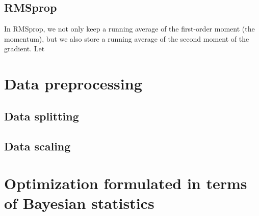 \subsection{RMSprop}
In RMSprop, we not only keep a running average of the first-order moment (the momentum), 
but we also store a running average of the second moment of the gradient. Let 

\section{Data preprocessing}
\subsection{Data splitting}
\subsection{Data scaling}

\section{Optimization formulated in terms of Bayesian statistics}